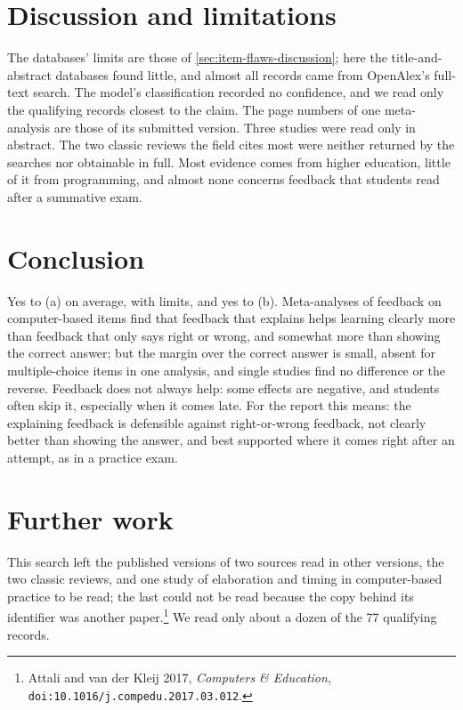 \section{Discussion and limitations}
\label{sec:feedback-discussion}

The databases' limits are those of \cref{sec:item-flaws-discussion}; here
the title-and-abstract databases found little, and almost all records came
from OpenAlex's full-text search.  The model's classification recorded no
confidence, and we read only the qualifying records closest to the claim.
The page numbers of one meta-analysis are those of its submitted version.
Three studies were read only in abstract.  The two classic reviews the
field cites most were neither returned by the searches nor obtainable in
full.  Most evidence comes from higher education, little of it from
programming, and almost none concerns feedback that students read after a
summative exam.

\section{Conclusion}
\label{sec:feedback-conclusion}

Yes to (a) on average, with limits, and yes to (b).  Meta-analyses of
feedback on computer-based items find that feedback that explains helps
learning clearly more than feedback that only says right or wrong, and
somewhat more than showing the correct answer; but the margin over the
correct answer is small, absent for multiple-choice items in one
analysis, and single studies find no difference or the reverse.  Feedback
does not always help: some effects are negative, and students often skip
it, especially when it comes late.  For the report this means: the
explaining feedback is defensible against right-or-wrong feedback, not
clearly better than showing the answer, and best supported where it comes
right after an attempt, as in a practice exam.

\section{Further work}
\label{sec:feedback-further}

This search left the published versions of two sources read in other
versions, the two classic reviews, and one study of elaboration and timing
in computer-based practice to be read; the last could not be read because
the copy behind its identifier was another
paper.\footnote{Attali and van der Kleij 2017, \emph{Computers \&
Education}, \texttt{doi:10.1016/j.compedu.2017.03.012}.}  We read only
about a dozen of the 77 qualifying records.

